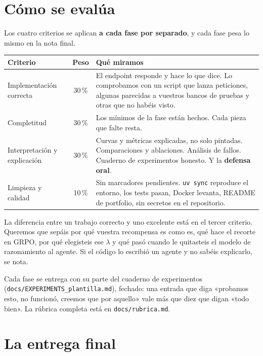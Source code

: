 \documentclass[11pt,a4paper]{article}
\newcommand{\code}[1]{{\small\texttt{#1}}}
\newcommand{\file}[1]{{\small\texttt{\textcolor{arcablue}{#1}}}}
\begin{document}
\section{Cómo se evalúa}

Los cuatro criterios se aplican \textbf{a cada fase por separado}, y cada fase pesa lo mismo
en la nota final.

\begin{center}
\small
\begin{tabularx}{\textwidth}{@{}l c X@{}}
\toprule
\textbf{Criterio} & \textbf{Peso} & \textbf{Qué miramos} \\
\midrule
Implementación correcta & 30\,\% & El endpoint responde y hace lo que dice. Lo comprobamos con
  un script que lanza peticiones, algunas parecidas a vuestros bancos de pruebas y otras que
  no habéis visto. \\
Completitud & 30\,\% & Los mínimos de la fase están hechos. Cada pieza que falte resta. \\
Interpretación y explicación & 30\,\% & Curvas y métricas explicadas, no solo pintadas.
  Comparaciones y ablaciones. Análisis de fallos. Cuaderno de experimentos honesto. Y la
  \textbf{defensa oral}. \\
Limpieza y calidad & 10\,\% & Sin marcadores pendientes. \code{uv sync} reproduce el entorno,
  los tests pasan, Docker levanta, README de portfolio, sin secretos en el repositorio. \\
\bottomrule
\end{tabularx}
\end{center}

La diferencia entre un trabajo correcto y uno excelente está en el tercer criterio. Queremos
que sepáis por qué vuestra recompensa es como es, qué hace el recorte en GRPO, por qué
elegisteis ese $\lambda$ y qué pasó cuando le quitasteis el modelo de razonamiento al agente.
Si el código lo escribió un agente y no sabéis explicarlo, se nota.

Cada fase se entrega con su parte del cuaderno de experimentos
(\file{docs/EXPERIMENTS\_plantilla.md}), fechado: una entrada que diga «probamos esto, no
funcionó, creemos que por aquello» vale más que diez que digan «todo bien». La rúbrica
completa está en \file{docs/rubrica.md}.

\section{La entrega final}
\end{document}
